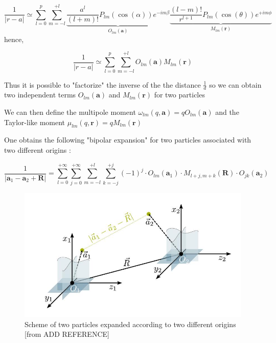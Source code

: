 \documentclass[12pt,twoside,a4paper]{report}
\begin{document}
		\begin{equation}
	\frac{1}{|r - a|} \simeq \sum\limits_{l=0}^{p} \sum\limits_{m = -l}^{+l}
	\underbrace{\frac{a^l}{(l+m)!} P_{lm}(\cos(\alpha))e^{-im\beta}} _{O_{lm}(\textbf{a})}
    \underbrace{\frac{(l-m)!}{r^{l+1}} P_{lm}(\cos(\theta))e^{+im\phi}} _{M_{lm}(\textbf{r})}
	\end{equation}
	hence,
	
		\begin{equation}
	\frac{1}{|r - a|} \simeq \sum\limits_{l=0}^{p} \sum\limits_{m = -l}^{+l}
	{O_{lm}(\textbf{a})}
    {M_{lm}(\textbf{r})}
	\end{equation}
	
	
	Thus it is possible to "factorize" the inverse of the the distance $\frac{1}{d}$ so we can obtain two independent terms ${O_{lm}(\textbf{a})}$ and ${M_{lm}(\textbf{r})}$  for two particles 


	We can then define the multipole moment $\omega_{lm}(q,\textbf{a}) = q O_{lm}(\textbf{a})$ and the Taylor-like moment $\mu_{lm}(q,\textbf{r}) = q M_{lm}(\textbf{r})$
	
	One obtains the following "bipolar expansion" for two particles associated with two different origins :
	
    \begin{equation}
    \frac{1}{|\textbf{a}_1 - \textbf{a}_2 + \textbf{R}|} = 
    \sum\limits_{l=0}^{+\infty}
    \sum\limits_{j=0}^{+\infty}
    \sum\limits_{m=-l}^{+l}
    \sum\limits_{k=-j}^{+j}
    (-1)^j \cdot O_{lm}(\textbf{a}_1) \cdot M_{l+j,m+k}(\textbf{R}) \cdot O_{jk}(\textbf{a}_2)
    \end{equation}



	\begin{figure}[H]

    \includegraphics[scale=0.7]{bipolar}
    \centering 
    \caption{Scheme of two particles expanded according to two different origins [from ADD REFERENCE]}
    \label{fig:bipolar}
    \end{figure}
\end{document}
